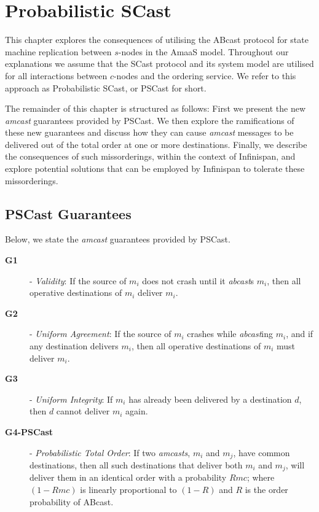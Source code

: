 \chapter{Probabilistic SCast}

    \graphicspath{{Chapter5-PSCast/Figs/Vector/}{Chapter5-PSCast/Figs/}}

This chapter explores the consequences of utilising the \textsf{ABcast} protocol for state machine replication between $s$-nodes in the \textsf{AmaaS} model.  Throughout our explanations we assume that the \textsf{SCast} protocol and its system model are utilised for all interactions between $c$-nodes and the ordering service.  We refer to this approach as Probabilistic \textsf{SCast}, or \textsf{PSCast} for short. 

The remainder of this chapter is structured as follows: First we present the new \emph{amcast} guarantees provided by \textsf{PSCast}.  We then explore the ramifications of these new guarantees and discuss how they can cause \emph{amcast} messages to be delivered out of the total order at one or more destinations.  Finally, we describe the consequences of such missorderings, within the context of Infinispan, and explore potential solutions that can be employed by Infinispan to tolerate these missorderings.  

\section{PSCast Guarantees}
Below, we state the \emph{amcast} guarantees provided by \textsf{PSCast}.  
   
    \begin{description}
        \item [\textbf{G1}] - \emph{Validity}: If the source of $m_i$ does not crash until it \emph{abcast}s $m_i$, then all operative destinations of $m_i$ deliver $m_i$.
       
        \item [\textbf{G2}] - \emph{Uniform Agreement}: If the source of $m_i$ crashes while \emph{abcast}ing $m_i$, and if any destination delivers $m_i$, then all operative
destinations of $m_i$ must deliver $m_i$.
        
        \item [\textbf{G3}] - \emph{Uniform Integrity}: If $m_i$ has already been delivered by a destination $d$, then $d$ cannot deliver $m_i$ again.  
       
        \item [\textbf{G4-PSCast}] - \emph{Probabilistic Total Order}: If two \emph{\emph{amcast}s}, $m_i$ and $m_j$, have common destinations, then all such destinations that deliver both $m_i$ and $m_j$, will deliver them in an identical order with a probability $Rmc$; where $(1-Rmc)$ is linearly proportional to $(1-R)$ and $R$ is the order probability of \textsf{ABcast}.  
\end{description}

